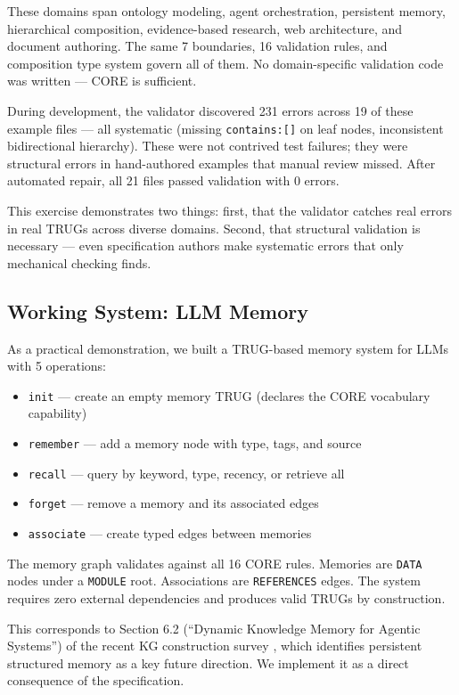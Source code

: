 \documentclass{article}
\begin{document}
These domains span ontology modeling, agent orchestration, persistent memory, hierarchical composition, evidence-based research, web architecture, and document authoring. The same 7 boundaries, 16 validation rules, and composition type system govern all of them. No domain-specific validation code was written --- CORE is sufficient.

During development, the validator discovered 231 errors across 19 of these example files --- all systematic (missing \texttt{contains:[]} on leaf nodes, inconsistent bidirectional hierarchy). These were not contrived test failures; they were structural errors in hand-authored examples that manual review missed. After automated repair, all 21 files passed validation with 0 errors.

This exercise demonstrates two things: first, that the validator catches real errors in real TRUGs across diverse domains. Second, that structural validation is necessary --- even specification authors make systematic errors that only mechanical checking finds.

\subsection{Working System: LLM Memory}

As a practical demonstration, we built a TRUG-based memory system for LLMs with 5 operations:

\begin{itemize}
    \item \texttt{init} --- create an empty memory TRUG (declares the CORE vocabulary capability)
    \item \texttt{remember} --- add a memory node with type, tags, and source
    \item \texttt{recall} --- query by keyword, type, recency, or retrieve all
    \item \texttt{forget} --- remove a memory and its associated edges
    \item \texttt{associate} --- create typed edges between memories
\end{itemize}

The memory graph validates against all 16 CORE rules. Memories are \texttt{DATA} nodes under a \texttt{MODULE} root. Associations are \texttt{REFERENCES} edges. The system requires zero external dependencies and produces valid TRUGs by construction.

This corresponds to Section 6.2 (``Dynamic Knowledge Memory for Agentic Systems'') of the recent KG construction survey \citep{bian2025llm}, which identifies persistent structured memory as a key future direction. We implement it as a direct consequence of the specification.
\end{document}
